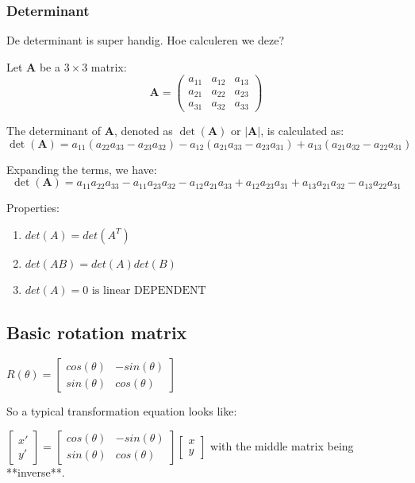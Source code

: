 \documentclass[a4paper]{report}
\begin{document}
\subsubsection{Determinant}

De determinant is super handig. Hoe calculeren we deze?

Let \(\mathbf{A}\) be a \(3 \times 3\) matrix:
\[
	\mathbf{A} =
	\begin{pmatrix}
		a_{11} & a_{12} & a_{13} \\
		a_{21} & a_{22} & a_{23} \\
		a_{31} & a_{32} & a_{33}
	\end{pmatrix}
\]

The determinant of \(\mathbf{A}\), denoted as \(\det(\mathbf{A})\) or \(|\mathbf{A}|\), is calculated as:
\[
	\det(\mathbf{A}) = a_{11}(a_{22}a_{33} - a_{23}a_{32}) - a_{12}(a_{21}a_{33} - a_{23}a_{31}) + a_{13}(a_{21}a_{32} - a_{22}a_{31})
\]

Expanding the terms, we have:
\[
	\det(\mathbf{A}) = a_{11}a_{22}a_{33} - a_{11}a_{23}a_{32} - a_{12}a_{21}a_{33} + a_{12}a_{23}a_{31} + a_{13}a_{21}a_{32} - a_{13}a_{22}a_{31}
\]

Properties:

\begin{enumerate}
	\item $det(A) = det(A^T)$
	\item $det(AB) = det(A) det(B)$
	\item $det(A) = 0 \text{ is linear DEPENDENT}$
\end{enumerate}

\subsection{Basic rotation matrix}

$R(\theta) = \begin{bmatrix} cos(\theta) & -sin(\theta) \\ sin(\theta) & cos(\theta) \end{bmatrix}$

So a typical transformation equation looks like:

$\begin{bmatrix} x' \\ y' \end{bmatrix} = \begin{bmatrix} cos(\theta) & -sin(\theta) \\ sin(\theta) & cos(\theta) \end{bmatrix} \begin{bmatrix} x \\ y \end{bmatrix}$
with the middle matrix being **inverse**.
\end{document}
